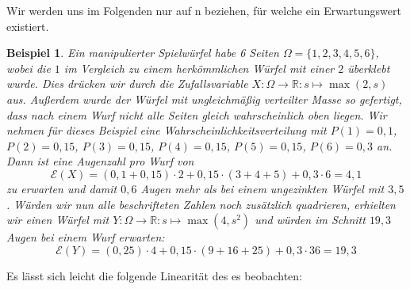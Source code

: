 \documentclass[a4paper]{article}
\newtheorem{beispiel}[satz]{Beispiel}
\theoremstyle{nonumberplain}
\begin{document}
	Wir werden uns im Folgenden nur auf \rvar n beziehen, für welche ein Erwartungswert existiert.
	\begin{beispiel}\label{example-expect}
		Ein manipulierter Spielwürfel habe 6 Seiten $\Omega = \{1,2,3,4,5,6\}$, wobei die $1$ im Vergleich zu einem herkömmlichen Würfel mit einer $2$ überklebt wurde. Dies drücken wir durch die Zufallsvariable $X : \Omega \to \mathbb{R} : s \mapsto \max(2,s)$ aus. Außerdem wurde der Würfel mit ungleichmäßig verteilter Masse so gefertigt, dass nach einem Wurf nicht alle Seiten gleich wahrscheinlich oben liegen. Wir nehmen für dieses Beispiel eine Wahrscheinlichkeitsverteilung mit $P(1)=0,1$, $P(2)=0,15$, $P(3)=0,15$, $P(4)=0,15$, $P(5)=0,15$, $P(6)=0,3$ an.
		Dann ist eine Augenzahl pro Wurf von
		\[
		\mathcal{E}(X) = (0,1 + 0,15) \cdot 2 + 0,15 \cdot (3 + 4 + 5) + 0,3 \cdot 6 = 4,1
		\]
		zu erwarten und damit $0,6$ Augen mehr als bei einem ungezinkten Würfel mit \expect{} $3,5$. Würden wir nun alle beschrifteten Zahlen noch zusätzlich quadrieren, erhielten wir einen Würfel mit $Y : \Omega \to \mathbb{R} : s \mapsto \max(4, s^2)$ und würden im Schnitt $19,3$ Augen bei einem Wurf erwarten:
		\[
		\mathcal{E}(Y) = (0,25) \cdot 4 + 0,15 \cdot (9 + 16 + 25) + 0,3 \cdot 36 = 19,3
		\]
	\end{beispiel}
	
	Es lässt sich leicht die folgende Linearität des \expect{}es beobachten:
	
\end{document}
